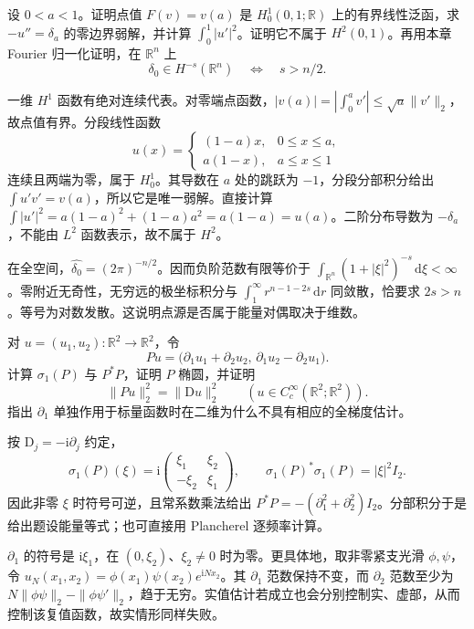 \begin{exercise}\label{g3:ex:point-source-energy}
	设 \(0<a<1\)。证明点值 \(F(v)=v(a)\) 是 \(H_0^1(0,1;\mathbb R)\) 上的有界线性泛函，求 \(-u''=\delta_a\) 的零边界弱解，并计算 \(\int_0^1|u'|^2\)。证明它不属于 \(H^2(0,1)\)。再用本章 Fourier 归一化证明，在 \(\mathbb R^n\) 上
	\[
		\delta_0\in H^{-s}(\mathbb R^n)\quad\Longleftrightarrow\quad s>n/2.
	\]
\end{exercise}
\begin{solution}
	一维 \(H^1\) 函数有绝对连续代表。对零端点函数，\(|v(a)|=|\int_0^av'|\le\sqrt a\|v'\|_2\)，故点值有界。分段线性函数
	\[
		u(x)=\begin{cases}(1-a)x,&0\le x\le a,\\ a(1-x),&a\le x\le1\end{cases}
	\]
	连续且两端为零，属于 \(H_0^1\)。其导数在 \(a\) 处的跳跃为 \(-1\)，分段分部积分给出 \(\int u'v'=v(a)\)，所以它是唯一弱解。直接计算
	\(\int|u'|^2=a(1-a)^2+(1-a)a^2=a(1-a)=u(a)\)。二阶分布导数为 \(-\delta_a\)，不能由 \(L^2\) 函数表示，故不属于 \(H^2\)。

	在全空间，\(\widehat{\delta_0}=(2\pi)^{-n/2}\)。因而负阶范数有限等价于
	\(\int_{\mathbb R^n}(1+|\xi|^2)^{-s}\,\mathrm d\xi<\infty\)。零附近无奇性，无穷远的极坐标积分与 \(\int_1^\infty r^{n-1-2s}\,\mathrm dr\) 同敛散，恰要求 \(2s>n\)。等号为对数发散。这说明点源是否属于能量对偶取决于维数。
\end{solution}

\begin{exercise}\label{g3:ex:div-curl-elliptic}
	对 \(u=(u_1,u_2):\mathbb R^2\to\mathbb R^2\)，令
	\[
		Pu=\bigl(\partial_1u_1+\partial_2u_2,\,
		\partial_1u_2-\partial_2u_1\bigr).
	\]
	计算 \(\sigma_1(P)\) 与 \(P^*P\)，证明 \(P\) 椭圆，并证明
	\[
		\|Pu\|_2^2=\|\mathrm Du\|_2^2\qquad(u\in C_c^\infty(\mathbb R^2;\mathbb R^2)).
	\]
	指出 \(\partial_1\) 单独作用于标量函数时在二维为什么不具有相应的全梯度估计。
\end{exercise}
\begin{solution}
	按 \(\mathrm D_j=-\mathrm i\partial_j\) 约定，
	\[
		\sigma_1(P)(\xi)=\mathrm i\begin{pmatrix}\xi_1&\xi_2\\-\xi_2&\xi_1\end{pmatrix},
		\qquad\sigma_1(P)^*\sigma_1(P)=|\xi|^2I_2.
	\]
	因此非零 \(\xi\) 时符号可逆，且常系数乘法给出
	\(P^*P=-(\partial_1^2+\partial_2^2)I_2\)。分部积分于是给出题设能量等式；也可直接用 Plancherel 逐频率计算。

	\(\partial_1\) 的符号是 \(\mathrm i\xi_1\)，在 \((0,\xi_2)\)、\(\xi_2\ne0\) 时为零。更具体地，取非零紧支光滑 \(\phi,\psi\)，令 \(u_N(x_1,x_2)=\phi(x_1)\psi(x_2)e^{\mathrm iNx_2}\)。其 \(\partial_1\) 范数保持不变，而 \(\partial_2\) 范数至少为 \(N\|\phi\psi\|_2-\|\phi\psi'\|_2\)，趋于无穷。实值估计若成立也会分别控制实、虚部，从而控制该复值函数，故实情形同样失败。
\end{solution}

